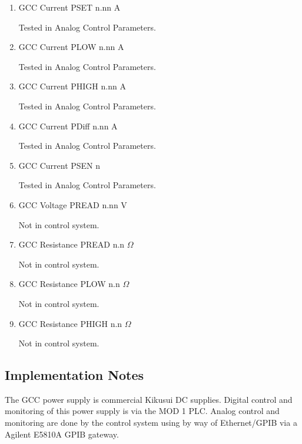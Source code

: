 \documentclass[11pt]{book}		%
\begin{document}
\begin{enumerate}
 \item GCC Current PSET  n.nn A

\color{red}
Tested in Analog Control Parameters.
\color{black}

 \item GCC Current PLOW  n.nn A

\color{red}
Tested in Analog Control Parameters.
\color{black}

 \item GCC Current PHIGH n.nn A

\color{red}
Tested in Analog Control Parameters.
\color{black}

 \item GCC Current PDiff n.nn A

\color{red}
Tested in Analog Control Parameters.
\color{black}

 \item GCC Current PSEN  n

\color{red}
Tested in Analog Control Parameters.
\color{black}

 \item GCC Voltage PREAD n.nn V

\color{red}
Not in control system.
\color{black}

 \item GCC Resistance PREAD n.n $\Omega$

\color{red}
Not in control system.
\color{black}

 \item GCC Resistance PLOW n.n $\Omega$

\color{red}
Not in control system.
\color{black}

 \item GCC Resistance PHIGH n.n $\Omega$

\color{red}
Not in control system.
\color{black}

\end{enumerate}

\subsection{Implementation Notes}

The GCC power supply is commercial Kikusui DC supplies.  Digital control and monitoring of this power supply is via the MOD 1 PLC.  Analog control and monitoring are done by the control system using by way of Ethernet/GPIB via a Agilent E5810A GPIB gateway.
\end{document}
